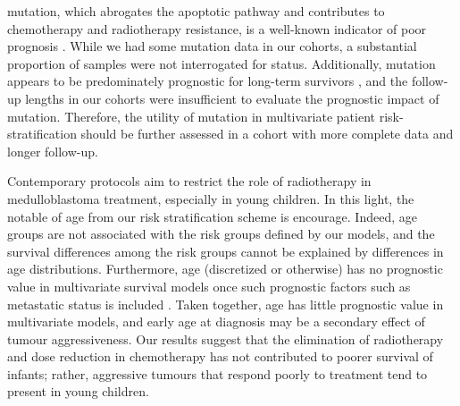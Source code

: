  mutation, which abrogates the apoptotic pathway and contributes to chemotherapy and radiotherapy resistance, is a well-known indicator of poor prognosis . While we had some  mutation data in our cohorts, a substantial proportion of samples were not interrogated for  status. Additionally,  mutation appears to be predominately prognostic for long-term survivors , and the follow-up lengths in our cohorts were insufficient to evaluate the prognostic impact of  mutation. Therefore, the utility of  mutation in multivariate patient risk-stratification should be further assessed in a cohort with more complete data and longer follow-up.

Contemporary protocols aim to restrict the role of radiotherapy in medulloblastoma treatment, especially in young children. In this light, the notable of age from our risk stratification scheme is encourage. Indeed, age groups are not associated with the risk groups defined by our models, and the survival differences among the risk groups cannot be explained by differences in age distributions. Furthermore, age (discretized or otherwise) has no prognostic value in multivariate survival models once such prognostic factors such as metastatic status is included . Taken together, age has little prognostic value in multivariate models, and early age at diagnosis may be a secondary effect of tumour aggressiveness. Our results suggest that the elimination of radiotherapy and dose reduction in chemotherapy has not contributed to poorer survival of infants; rather, aggressive tumours that respond poorly to treatment tend to present in young children.

